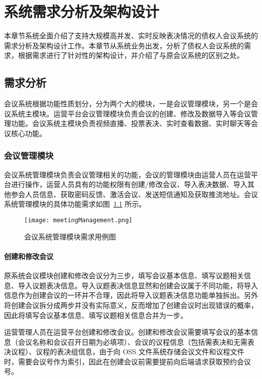
\chapter{系统需求分析及架构设计}
本章节系统全面介绍了支持大规模高并发、实时反映表决情况的债权人会议系统的需求分析及架构设计工作。本章节从系统业务出发，分析了债权人会议系统的需求，根据需求进行了针对性的架构设计，并介绍了与原会议系统的区别之处。

\section{需求分析}

会议系统根据功能性质划分，分为两个大的模块，一是会议管理模块，另一个是会议系统主模块。运营平台会议管理模块负责会议的创建、修改及数据导入等会议管理功能。会议系统主模块负责视频直播、投票表决、实时查看数据、实时聊天等会议核心功能。

\subsection{会议管理模块}

会议系统管理模块负责会议管理相关的功能，会议的管理模块由运营人员在运营平台进行操作，运营人员具有的功能权限有创建/修改会议、导入表决数据、导入其他参会人员信息、获取密码反馈、激活会议、发送短信通知及获取推流地址。会议系统管理模块的具体功能需求如图~\ref{fig:meetingManagement} 所示。

\begin{figure}[!htp]
  \centering
  \texttt{[image: meetingManagement.png]}
  \caption[管理模块]
    {会议系统管理模块需求用例图}
 \label{fig:meetingManagement}
\end{figure}

\subsubsection{创建和修改会议}
原系统会议模块创建和修改会议分为三步，填写会议基本信息、填写议题相关信息、导入议题表决信息。导入议题表决信息显然和创建会议属于不同功能，将导入信息作为创建会议的一环并不合理，因此将导入议题表决信息功能单独拆出。另外将创建会议拆分成两步并没有实际意义，反而增加了创建会议时出现错误的概率，因此将填写会议基本信息、填写议题相关信息合并为一步。

运营管理人员在运营平台创建和修改会议。创建和修改会议需要填写会议的基本信息（会议名称和会议召开日期为必填项）、会议的议程信息（包括需表决和无需表决议程）、议程的表决组信息，由于向 OSS 文件系统存储会议文件和议程文件时，需要会议号作为索引，因此在创建会议前需要提前向后端请求获取预约会议号。

